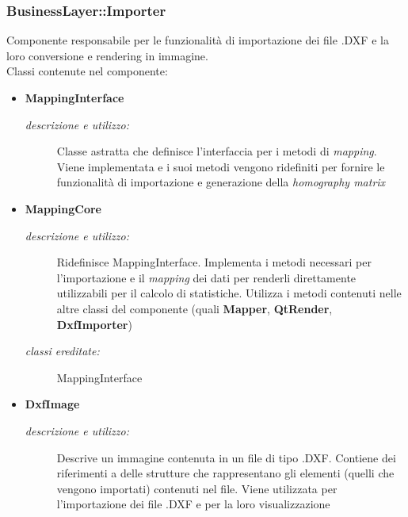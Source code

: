 \subsubsection{BusinessLayer::Importer} \label{sec:c2.2}
Componente responsabile per le funzionalità di importazione dei file .DXF e la loro conversione e rendering in immagine. \\
Classi contenute nel componente: 
\begin{itemize} 
\item \textbf{MappingInterface}
\begin{description}
\item [\textit{descrizione e utilizzo:}] Classe astratta che definisce l'interfaccia per i metodi di \textit{mapping}. Viene implementata e i suoi metodi vengono ridefiniti per fornire le funzionalità di importazione e generazione della \textit{homography matrix}
\end{description}
\item \textbf{MappingCore}
\begin{description}
\item [\textit{descrizione e utilizzo:}] Ridefinisce MappingInterface. Implementa i metodi necessari per l'importazione e il \textit{mapping} dei dati per renderli direttamente utilizzabili per il calcolo di statistiche. Utilizza i metodi contenuti nelle altre classi del componente (quali \textbf{Mapper}, \textbf{QtRender}, \textbf{DxfImporter})
\item [\textit{classi ereditate:}] MappingInterface
\end{description}
\item \textbf{DxfImage}
\begin{description}
\item [\textit{descrizione e utilizzo:}] Descrive un immagine contenuta in un file di tipo .DXF. Contiene dei riferimenti a delle strutture che rappresentano gli elementi (quelli che vengono importati) contenuti nel file. Viene utilizzata per l'importazione dei file .DXF e per la loro visualizzazione


\end{description}
\end{itemize}
